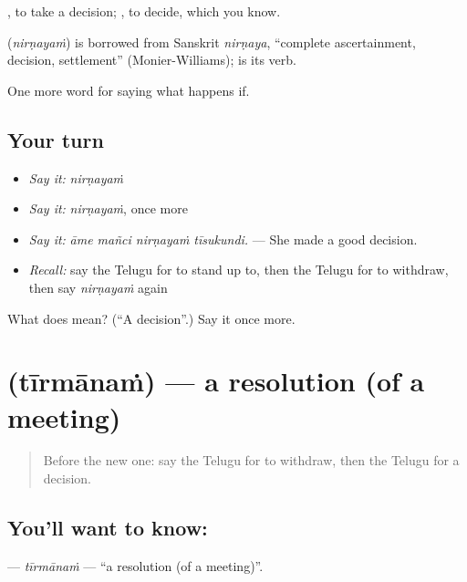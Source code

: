  , to take a decision; , to decide, which you know.

\begin{cousinweb}
\textbf{} (\emph{nirṇayaṁ}) is borrowed from Sanskrit \emph{nirṇaya}, \textquotedblleft{}complete ascertainment, decision, settlement\textquotedblright{} (Monier-Williams);  is its verb.
\end{cousinweb}

\begin{grammarlens}[title={What you've built}]
One more word for saying what happens if.
\end{grammarlens}

\subsection*{Your turn}
\begin{itemize}
\raggedright
  \item \emph{Say it:} \emph{nirṇayaṁ}
  \item \emph{Say it:} \emph{nirṇayaṁ}, once more
  \item \emph{Say it:} \emph{āme mañci nirṇayaṁ tīsukundi.} — She made a good decision.
  \item \emph{Recall:} say the Telugu for to stand up to, then the Telugu for to withdraw, then say \emph{nirṇayaṁ} again
\end{itemize}

\begin{tcolorbox}[breakable,colback=teal!4,colframe=teal!35!black,title={Before you move on}]
What does  mean? (\textquotedblleft{}A decision\textquotedblright{}.) Say it once more.
\end{tcolorbox}
\section[\texorpdfstring{\te{తీర్మానం} (tīrmānaṁ)}{తీర్మానం (tīrmānaṁ)}]{ (tīrmānaṁ) — a resolution (of a meeting)}

\label{lesson:TE-C425-tirmanam}



\begin{quote}
Before the new one: say the Telugu for to withdraw, then the Telugu for a decision.
\end{quote}

\subsection*{You'll want to know: }
\textbf{} — \emph{tīrmānaṁ} — \textquotedblleft{}a resolution (of a meeting)\textquotedblright{}.

